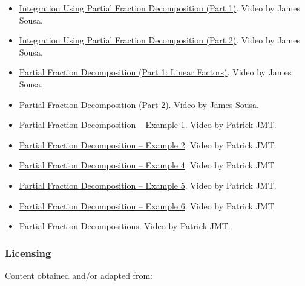 \begin{itemize}

\item \href{https://youtu.be/8MMALX7mUqQ}{Integration Using Partial Fraction Decomposition (Part 1)}.  
Video by James Sousa.

\item \href{https://youtu.be/BgVNLWLJmMs}{Integration Using Partial Fraction Decomposition (Part 2)}.  
Video by James Sousa.

\item \href{https://youtu.be/c2oLHtPA03U}{Partial Fraction Decomposition (Part 1: Linear Factors)}.  
Video by James Sousa.

\item \href{https://youtu.be/SQ4l8yDlBVE}{Partial Fraction Decomposition (Part 2)}.  
Video by James Sousa.

\item \href{https://youtu.be/HZTv4zCgEnA}{Partial Fraction Decomposition – Example 1}.  
Video by Patrick JMT.

\item \href{https://youtu.be/hnIs8uwAT3U}{Partial Fraction Decomposition – Example 2}.  
Video by Patrick JMT.

\item \href{https://youtu.be/lH9Mw65vAIA}{Partial Fraction Decomposition – Example 4}.  
Video by Patrick JMT.

\item \href{https://youtu.be/Slfrb8aEj08}{Partial Fraction Decomposition – Example 5}.  
Video by Patrick JMT.

\item \href{https://youtu.be/_YMG5mQTAOg}{Partial Fraction Decomposition – Example 6}.  
Video by Patrick JMT.

\item \href{https://youtu.be/7GcSOjLitF8}{Partial Fraction Decompositions}.  
Video by Patrick JMT.

\end{itemize}

\subsubsection{Licensing}
\label{sss:lice-7352}

Content obtained and/or adapted from:

